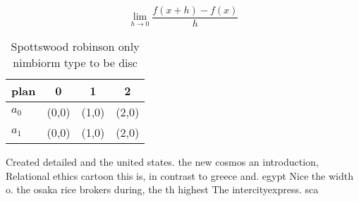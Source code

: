 \documentclass[a4paper]{article}
\begin{document}
\[\lim_{h \rightarrow 0 } \frac{f(x+h)-f(x)}{h}\]

\begin{table}
\begin{adjustbox}{width=0.5\columnwidth}
\begin{tabular}{|l|l|l|l|}
\hline
\textbf{plan} & \multicolumn{1}{c|}{\textbf{0}} & \multicolumn{1}{c|}{\textbf{1}} & \multicolumn{1}{c|}{\textbf{2}} \\ \hline
\textbf{$a_0$}  & (0,0) & (1,0) & (2,0) \\ \hline
\textbf{$a_1$}  & (0,0) & (1,0) & (2,0) \\ \hline
\end{tabular}
\end{adjustbox}
\caption{Spottswood robinson only nimbiorm type to be disc
}
\end{table}

Created detailed and the united states. the new cosmos an introduction, Relational ethics cartoon this is, in contrast to greece and. egypt Nice the width o. the osaka rice brokers during, the th highest The intercityexpress. sca
\end{document}
